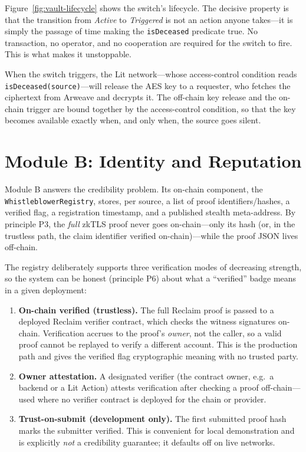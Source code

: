 Figure~\ref{fig:vault-lifecycle} shows the switch's lifecycle. The decisive
property is that the transition from \emph{Active} to \emph{Triggered} is not an
action anyone takes---it is simply the passage of time making the
\texttt{isDeceased} predicate true. No transaction, no operator, and no
cooperation are required for the switch to fire. This is what makes it
unstoppable.

When the switch triggers, the Lit network---whose access-control condition reads
\texttt{isDeceased(source)}---will release the AES key to a requester, who fetches
the ciphertext from Arweave and decrypts it. The off-chain key release and the
on-chain trigger are bound together by the access-control condition, so that the
key becomes available exactly when, and only when, the source goes silent.

\section{Module B: Identity and Reputation}
\label{sec:design-identity}

Module B answers the credibility problem. Its on-chain component, the
\texttt{WhistleblowerRegistry}, stores, per source, a list of proof
identifiers/hashes, a verified flag, a registration timestamp, and a published
stealth meta-address. By principle P3, the \emph{full} zkTLS proof never goes
on-chain---only its hash (or, in the trustless path, the claim identifier
verified on-chain)---while the proof JSON lives off-chain.

The registry deliberately supports three verification modes of decreasing
strength, so the system can be honest (principle P6) about what a ``verified''
badge means in a given deployment:

\begin{enumerate}
  \item \textbf{On-chain verified (trustless).} The full Reclaim proof is passed
  to a deployed Reclaim verifier contract, which checks the witness signatures
  on-chain. Verification accrues to the proof's \emph{owner}, not the caller, so a
  valid proof cannot be replayed to verify a different account. This is the
  production path and gives the verified flag cryptographic meaning with no
  trusted party.
  \item \textbf{Owner attestation.} A designated verifier (the contract owner,
  e.g.\ a backend or a Lit Action) attests verification after checking a proof
  off-chain---used where no verifier contract is deployed for the chain or
  provider.
  \item \textbf{Trust-on-submit (development only).} The first submitted proof
  hash marks the submitter verified. This is convenient for local demonstration
  and is explicitly \emph{not} a credibility guarantee; it defaults off on live
  networks.
\end{enumerate}

